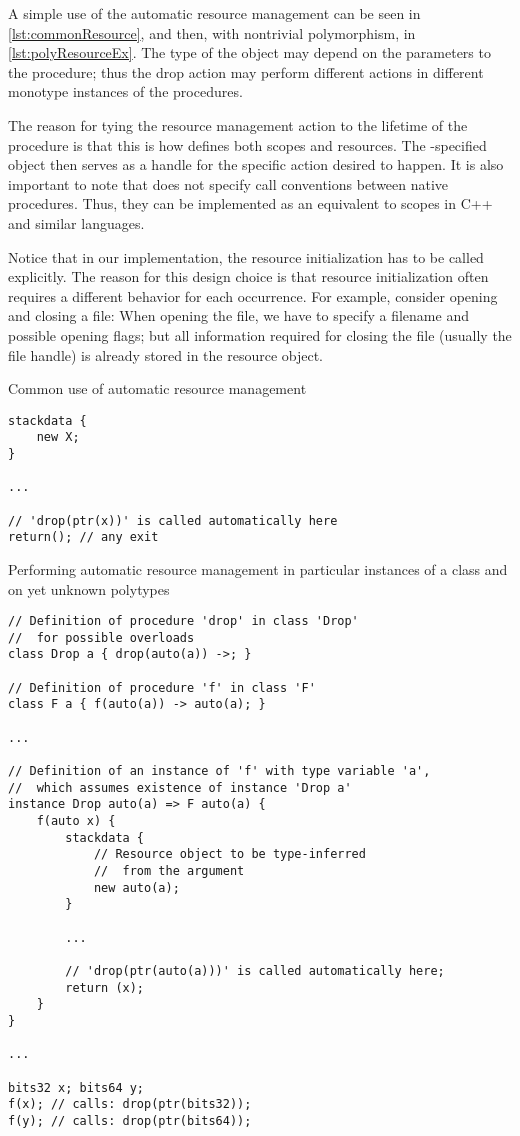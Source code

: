 A simple use of the automatic resource management can be seen in \cref{lst:commonResource}, and then, with nontrivial polymorphism, in \cref{lst:polyResourceEx}. The type of the object may depend on the parameters to the procedure; thus the drop action may perform different actions in different monotype instances of the procedures.

The reason for tying the resource management action to the lifetime of the procedure is that this is how \cmm defines both scopes and resources. The -specified object then serves as a handle for the specific action desired to happen. It is also important to note that \cmm does not specify call conventions between native \cmm procedures. Thus, they can be implemented as an equivalent to scopes in C++ and similar languages.

Notice that in our implementation, the resource initialization has to be called explicitly. The reason for this design choice is that resource initialization often requires a different behavior for each occurrence. For example, consider opening and closing a file: When opening the file, we have to specify a filename and possible opening flags; but all information required for closing the file (usually the file handle) is already stored in the resource object.

\begin{codex}
    \caption{Common use of automatic resource management}
    \label{lst:commonResource}
    \begin{lstlisting}
stackdata {
    new X;
}

...

// 'drop(ptr(x))' is called automatically here
return(); // any exit
    \end{lstlisting}
\end{codex}

\begin{codex}
    \caption{Performing automatic resource management in particular instances of a class and on yet unknown polytypes}
    \label{lst:polyResourceEx}
    \begin{lstlisting}
// Definition of procedure 'drop' in class 'Drop'
//  for possible overloads
class Drop a { drop(auto(a)) ->; }

// Definition of procedure 'f' in class 'F'
class F a { f(auto(a)) -> auto(a); }

...

// Definition of an instance of 'f' with type variable 'a',
//  which assumes existence of instance 'Drop a'
instance Drop auto(a) => F auto(a) {
    f(auto x) {
        stackdata {
            // Resource object to be type-inferred
            //  from the argument
            new auto(a);
        }

        ...

        // 'drop(ptr(auto(a)))' is called automatically here;
        return (x);
    }
}

...

bits32 x; bits64 y;
f(x); // calls: drop(ptr(bits32));
f(y); // calls: drop(ptr(bits64));
    \end{lstlisting}
\end{codex}

